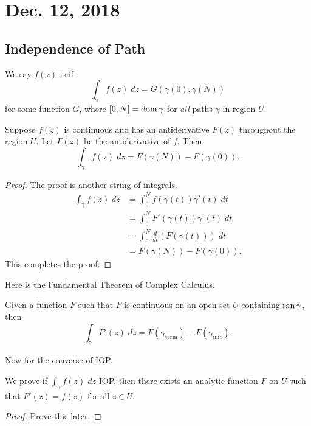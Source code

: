 \documentclass[notes]{subfile}
\begin{document}
\section{Dec. 12, 2018}

\subsection{Independence of Path}

We say $f(z)$ is  if
\[ \int_{\gamma} f(z) \; dz = G(\gamma(0), \gamma(N)) \]
for some function $G$, where $[0,N] = \operatorname{dom}{\gamma}$ for 
\textit{all} paths $\gamma$ in region $U$.

\begin{theorem}
    Suppose $f(z)$ is continuous and has an antiderivative $F(z)$ throughout the region $U$.
    Let $F(z)$ be the antiderivative of $f$.
    Then
    \[ \int_{\gamma} f(z) \; dz = F(\gamma(N)) - F(\gamma(0)). \]
\end{theorem}

\begin{proof}
    The proof is another string of integrals.
    \begin{align*}
        \int_{\gamma} f(z) \; dz &= \int_0^N f(\gamma(t)) \gamma'(t) \; dt \\
        &= \int_0^N F'(\gamma(t)) \gamma'(t) \; dt \\
        &= \int_0^N \frac{d}{dt} (F(\gamma(t))) \; dt \\
        &= F(\gamma(N)) - F(\gamma(0)).
    \end{align*}
    This completes the proof.
\end{proof}

Here is the Fundamental Theorem of Complex Calculus.
\begin{theorem}
    Given a function $F$ such that $F$ is continuous on an open
    set $U$ containing $\operatorname{ran}{\gamma}$, then
    \[ \int_{\gamma} F'(z) \; dz = F(\gamma_{\text{term}}) -
    F(\gamma_{\text{init}}). \]
\end{theorem}

Now for the converse of IOP.
\begin{theorem}
    We prove if $\int_{\gamma} f(z) \; dz$ IOP, then there exists
    an analytic function $F$ on $U$ such that $F'(z) = f(z)$ for
    all $z \in U$.
\end{theorem}

\begin{proof}
    Prove this later.
\end{proof}
\end{document}
